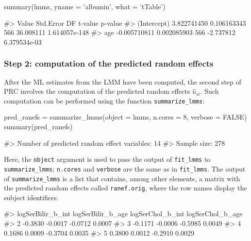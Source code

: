 \begin{Schunk}
\begin{Sinput}
summary(lmms, yname = 'albumin', what = 'tTable')
\end{Sinput}
\begin{Soutput}
#>                    Value   Std.Error  DF   t-value       p-value
#> (Intercept)  3.822741450 0.106163343 566 36.008111 1.614057e-148
#> age         -0.005710811 0.002085903 566 -2.737812  6.379534e-03
\end{Soutput}
\end{Schunk}

\subsubsection{Step 2: computation of the predicted random
effects}\label{step-2-computation-of-the-predicted-random-effects}

After the ML estimates from the LMM have been computed, the second step
of PRC involves the computation of the predicted random effects
\(\hat{u}_{si}\). Such computation can be performed using the function
\texttt{summarize\_lmms}:

\begin{Schunk}
\begin{Sinput}
pred_ranefs = summarize_lmms(object = lmms, n.cores = 8, verbose = FALSE)
summary(pred_ranefs)
\end{Sinput}
\begin{Soutput}
#> Number of predicted random effect variables: 14
#> Sample size: 278
\end{Soutput}
\end{Schunk}

Here, the \texttt{object} argument is used to pass the output of
\texttt{fit\_lmms} to \texttt{summarize\_lmms}; \texttt{n.cores} and
\texttt{verbose} are the same as in \texttt{fit\_lmms}. The output of
\texttt{summarize\_lmms} is a list that contains, among other elements,
a matrix with the predicted random effects called \texttt{ranef.orig},
where the row names display the subject identifiers:

\begin{Schunk}
\begin{Soutput}
#>   logSerBilir_b_int logSerBilir_b_age logSerChol_b_int logSerChol_b_age
#> 2           -0.3830           -0.0017          -0.0712           0.0007
#> 3           -0.1171           -0.0006          -0.5985           0.0049
#> 4            0.1686            0.0009          -0.3704           0.0035
#> 5            0.3800            0.0012          -0.2910           0.0029
\end{Soutput}
\end{Schunk}

